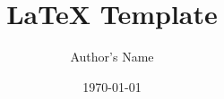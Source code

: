 \documentclass[12pt]{article} %
\title{\LaTeX{} Template} %
\author{Author's Name} %
\date{\today} %
\begin{document}
\maketitle
\newcommand{\ds}{\displaystyle}

\end{document}
